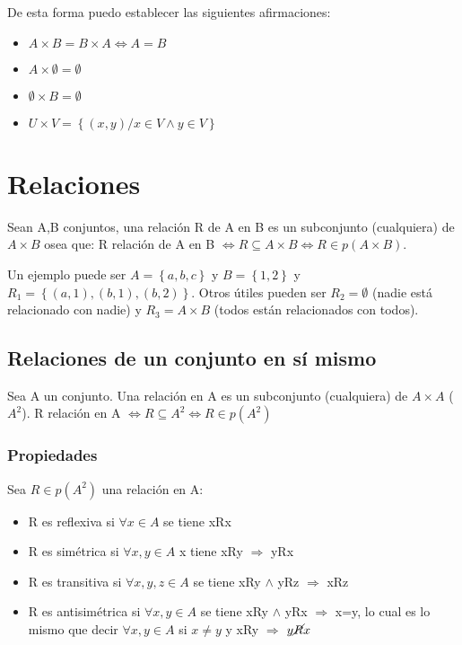 \documentclass{report}
\begin{document}
De esta forma puedo establecer las siguientes afirmaciones: \begin{itemize}
    \item \begin{math}
        A \times B = B \times A \iff A=B
    \end{math}
    \item \begin{math}
        A \times \emptyset = \emptyset
    \end{math}
    \item \begin{math}
        \emptyset \times B = \emptyset
    \end{math}
    \item \begin{math}
        U \times V = \left\{(x,y)/x\in V \land y \in V \right\}
    \end{math}
\end{itemize}

\section{Relaciones}

Sean A,B conjuntos, una relación R de A en B es un subconjunto (cualquiera) de $A \times B$ osea que: R relación de A en B $\iff R \subseteq A\times B \iff R \in p(A\times B)$.

Un ejemplo puede ser $A=\left\{a,b,c\right\}$ y $B=\left\{1,2\right\}$ y $R_1 = \left\{(a,1),(b,1),(b,2)\right\}$. Otros útiles pueden ser $R_2 = \emptyset$ (nadie está relacionado con nadie) y $R_3 = A\times B$ (todos están relacionados con todos).

\subsection{Relaciones de un conjunto en sí mismo}

Sea A un conjunto. Una relación en A es un subconjunto (cualquiera) de $A\times A$ ($A^2$). R relación en A $\iff R \subseteq A^2 \iff R \in p(A^2)$

\subsubsection{Propiedades}
Sea $R \in p(A^2)$ una relación en A:\begin{itemize}
    \item R es reflexiva si $\forall x \in A$ se tiene xRx
    \item R es simétrica si $\forall x, y \in A$ x tiene xRy $\Rightarrow$ yRx
    \item R es transitiva si $\forall x,y,z \in A$ se tiene xRy $\land$ yRz $\Rightarrow$ xRz
    \item R es antisimétrica si $\forall x,y \in A$ se tiene xRy $\land$ yRx $\Rightarrow$ x=y, lo cual es lo mismo que decir $\forall x,y \in A$ si $x \neq y$ y xRy $\Rightarrow$ $y \cancel{R} x$
\end{itemize}
\end{document}
